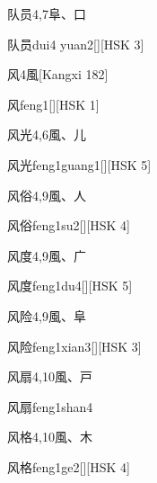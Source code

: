 \begin{entry}{队员}{4,7}{⾩、⼝}
  \begin{phonetics}{队员}{dui4 yuan2}[][HSK 3]
  \end{phonetics}
\end{entry}

\begin{entry}{风}{4}{⾵}[Kangxi 182]
  \begin{phonetics}{风}{feng1}[][HSK 1]
  \end{phonetics}
\end{entry}

\begin{entry}{风光}{4,6}{⾵、⼉}
  \begin{phonetics}{风光}{feng1guang1}[][HSK 5]
  \end{phonetics}
\end{entry}

\begin{entry}{风俗}{4,9}{⾵、⼈}
  \begin{phonetics}{风俗}{feng1su2}[][HSK 4]
  \end{phonetics}
\end{entry}

\begin{entry}{风度}{4,9}{⾵、⼴}
  \begin{phonetics}{风度}{feng1du4}[][HSK 5]
  \end{phonetics}
\end{entry}

\begin{entry}{风险}{4,9}{⾵、⾩}
  \begin{phonetics}{风险}{feng1xian3}[][HSK 3]
  \end{phonetics}
\end{entry}

\begin{entry}{风扇}{4,10}{⾵、⼾}
  \begin{phonetics}{风扇}{feng1shan4}
  \end{phonetics}
\end{entry}

\begin{entry}{风格}{4,10}{⾵、⽊}
  \begin{phonetics}{风格}{feng1ge2}[][HSK 4]
  \end{phonetics}
\end{entry}

